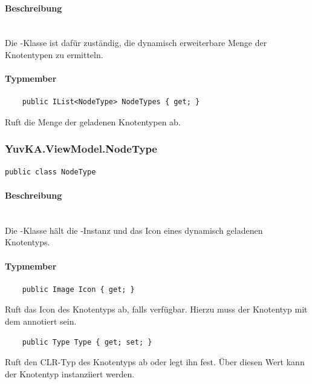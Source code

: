 \paragraph{Beschreibung}~\\
Die -Klasse ist dafür zuständig, die dynamisch erweiterbare Menge der Knotentypen zu ermitteln.

\paragraph{Typmember}
\begin{itemize}

	\begin{verbatim}
	public IList<NodeType> NodeTypes { get; }
	\end{verbatim}
	Ruft die Menge der geladenen Knotentypen ab.

\end{itemize}

\subsubsection{YuvKA.ViewModel.NodeType}

\begin{verbatim}
public class NodeType
\end{verbatim}

\paragraph{Beschreibung}~\\
Die -Klasse hält die -Instanz und das Icon eines dynamisch geladenen Knotentyps.

\paragraph{Typmember}
\begin{itemize}

	\begin{verbatim}
	public Image Icon { get; }
	\end{verbatim}
	Ruft das Icon des Knotentyps ab, falls verfügbar. Hierzu muss der Knotentyp mit dem  annotiert sein.

	\begin{verbatim}
	public Type Type { get; set; }
	\end{verbatim}
	Ruft den CLR-Typ des Knotentyps ab oder legt ihn fest. Über diesen Wert kann der Knotentyp instanziiert werden.

\end{itemize}